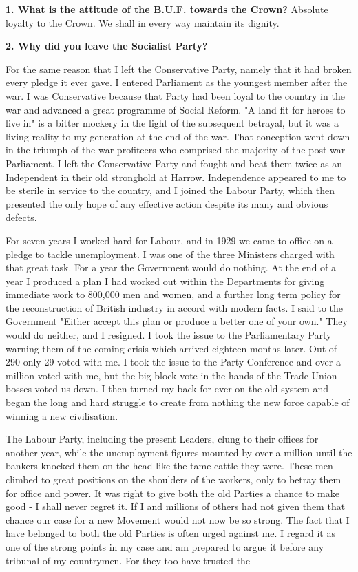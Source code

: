 \documentclass{book}
\begin{document}
\newpage
{}
\pagestyle{plain}
\pagecolor{white}
\color{black}
\begin{flushright}
\textbf{1. What is the attitude of the B.U.F. towards the Crown?}
Absolute loyalty to the Crown. We shall in every way maintain its
dignity.
\end{flushright}
\begin{flushleft}
\textbf{2. Why did you leave the Socialist Party?}

For the same reason that I left the Conservative Party, namely that it had broken every pledge it
ever gave. I entered Parliament as the youngest member after the war. I was Conservative
because that Party had been loyal to the country in the war and advanced a great programme of
Social Reform. "A land fit for heroes to live in" is a bitter mockery in the light of the subsequent
betrayal, but it was a living reality to my generation at the end of the war. That conception went
down in the triumph of the war profiteers who comprised the majority of the post-war Parliament.
I left the Conservative Party and fought and beat them twice as an Independent in their old
stronghold at Harrow. Independence appeared to me to be sterile in service to the country, and I
joined the Labour Party, which then presented the only hope of any effective action despite its
many and obvious defects.

For seven years I worked hard for Labour, and in 1929 we came to office on a pledge to tackle
unemployment. I was one of the three Ministers charged with that great task. For a year the
Government would do nothing. At the end of a year I produced a plan I had worked out within
the Departments for giving immediate work to 800,000 men and women, and a further long term
policy for the reconstruction of British industry in accord with modern facts. I said to the
Government "Either accept this plan or produce a better one of your own." They would do
neither, and I resigned. I took the issue to the Parliamentary Party warning them of the coming
crisis which arrived eighteen months later. Out of 290 only 29 voted with me. I took the issue to
the Party Conference and over a million voted with me, but the big block vote in the hands of the
Trade Union bosses voted us down. I then turned my back for ever on the old system and began
the long and hard struggle to create from nothing the new force capable of winning a new
civilisation.

The Labour Party, including the present Leaders, clung to their offices for another year, while the
unemployment figures mounted by over a million until the bankers knocked them on the head
like the tame cattle they were. These men climbed to great positions on the shoulders of the
workers, only to betray them for office and power. It was right to give both the old Parties a
chance to make good - I shall never regret it. If I and millions of others had not given them that
chance our case for a new Movement would not now be so strong. The fact that I have belonged
to both the old Parties is often urged against me. I regard it as one of the strong points in my case
and am prepared to argue it before any tribunal of my countrymen. For they too have trusted the
\end{flushleft}
\end{document}
